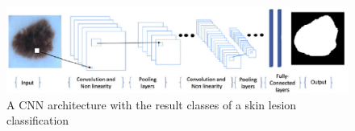 \begin{figure}
    \centerline{\includegraphics[width=1\columnwidth]{03-neural-networks-in-tumor-detection/figures/cnn-architecture-image-classification.png}}
    \caption{ A CNN architecture with the result classes of a skin lesion classification}
    \label{figure:sample-cnn-architecture-skin-lesion-classification}
\end{figure}